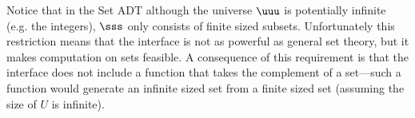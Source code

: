 


\begin{gram}
Notice that in the Set ADT although the universe $\uuu$ is potentially
infinite (e.g. the integers), $\sss$ only consists of finite sized
subsets.
%
Unfortunately this restriction
means that the interface is not as powerful as general set theory, but
it makes computation on sets feasible.  A consequence of this
requirement is that the interface does not include a function that
takes the complement of a set---such a function would generate an
infinite sized set from a finite sized set (assuming the size of $U$
is infinite).
\end{gram}

